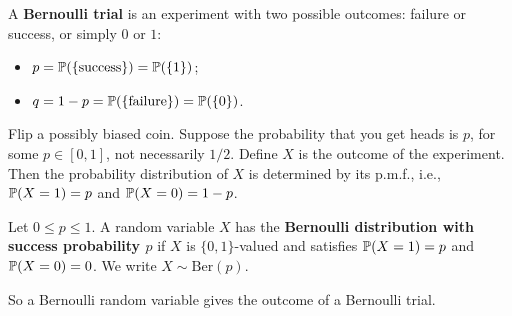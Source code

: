 A \textbf{Bernoulli trial} is an experiment with two possible outcomes: failure
or success, or simply $0$ or $1$:
\begin{itemize}
\item $p = \mathbb{P}(\{\text{success}\}) = \mathbb{P}(\{1\})$;
\item $q = 1-p = \mathbb{P}(\{\text{failure}\}) = \mathbb{P}(\{0\})$.
\end{itemize}
\begin{example}
  Flip a possibly biased coin. Suppose the probability that you get heads is
  $p$, for some $p\in [0,1]$, not necessarily $1/2$. Define $X$ is the outcome of the experiment. Then the probability
  distribution of $X$ is determined by its p.m.f., i.e., $\mathbb{P}(X = 1) = p$ and $\mathbb{P}(X = 0 ) = 1-p$.
\end{example}
\begin{definition}
  Let $0\le p\le 1$. A random variable $X$ has the \textbf{Bernoulli
    distribution with success probability $p$} if $X$ is $\{0,1\}$-valued and
  satisfies $\mathbb{P}(X =1) = p$ and $\mathbb{P}(X = 0)=0$. We write $X\sim\text{Ber}(p)$.
\end{definition}
So a Bernoulli random variable gives the outcome of a Bernoulli trial.

